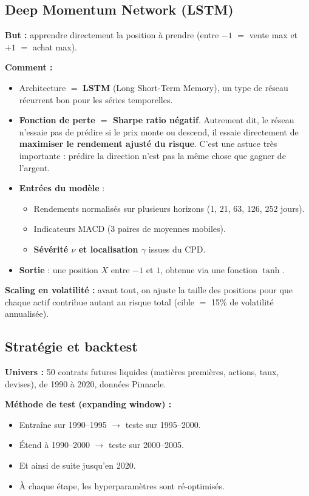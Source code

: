 \documentclass[11pt,a4paper]{article}
\begin{document}
\subsection{Deep Momentum Network (LSTM)}

\textbf{But :} apprendre directement la position à prendre (entre $-1$ $=$ vente max et $+1$ $=$ achat max).

\textbf{Comment :}
\begin{itemize}[leftmargin=*]
    \item Architecture $=$ \textbf{LSTM} (Long Short-Term Memory), un type de réseau récurrent bon pour les séries temporelles.
    \item \textbf{Fonction de perte $=$ Sharpe ratio négatif}. Autrement dit, le réseau n'essaie pas de prédire si le prix monte ou descend, il essaie directement de \textbf{maximiser le rendement ajusté du risque}. C'est une astuce très importante : prédire la direction n'est pas la même chose que gagner de l'argent.
    \item \textbf{Entrées du modèle} :
    \begin{itemize}
        \item Rendements normalisés sur plusieurs horizons (1, 21, 63, 126, 252 jours).
        \item Indicateurs MACD (3 paires de moyennes mobiles).
        \item \textbf{Sévérité $\nu$ et localisation $\gamma$} issues du CPD.
    \end{itemize}
    \item \textbf{Sortie} : une position $X$ entre $-1$ et $1$, obtenue via une fonction $\tanh$.
\end{itemize}

\textbf{Scaling en volatilité :} avant tout, on ajuste la taille des positions pour que chaque actif contribue autant au risque total (cible $=$ 15\% de volatilité annualisée).

\subsection{Stratégie et backtest}

\textbf{Univers :} 50 contrats futures liquides (matières premières, actions, taux, devises), de 1990 à 2020, données Pinnacle.

\textbf{Méthode de test (expanding window) :}
\begin{itemize}[leftmargin=*]
    \item Entraîne sur 1990--1995 $\rightarrow$ teste sur 1995--2000.
    \item Étend à 1990--2000 $\rightarrow$ teste sur 2000--2005.
    \item Et ainsi de suite jusqu'en 2020.
    \item À chaque étape, les hyperparamètres sont ré-optimisés.
\end{itemize}
\end{document}
